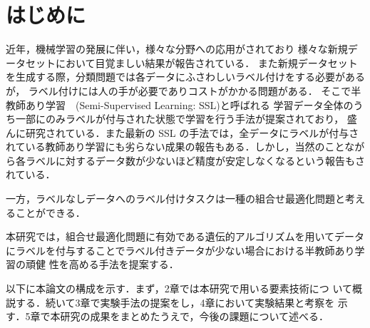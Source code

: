\newpage
\changeindent{0cm}
\section{はじめに}
\changeindent{2cm}
近年，機械学習の発展に伴い，様々な分野への応用がされており
様々な新規データセットにおいて目覚ましい結果が報告されている．
また新規データセットを生成する際，分類問題では各データにふさわしいラベル付けをする必要があるが，
ラベル付けには人の手が必要でありコストがかかる問題がある．
そこで半教師あり学習　(Semi-Supervised Learning: SSL)と呼ばれる
学習データ全体のうち一部にのみラベルが付与された状態で学習を行う手法が提案されており，
盛んに研究されている．また最新の SSL の手法では，全データにラベルが付与されている教師あり学習にも劣らない成果の報告\cite{sohn2020fixmatch}もある．しかし，当然のことながら各ラベルに対するデータ数が少ないほど精度が安定しなくなるという報告もされている．

一方，ラベルなしデータへのラベル付けタスクは一種の組合せ最適化問題と考えることができる．

本研究では，組合せ最適化問題に有効である遺伝的アルゴリズムを用いてデータにラベルを付与することでラベル付きデータが少ない場合における半教師あり学習の頑健
性を高める手法を提案する．

以下に本論文の構成を示す．まず，2章では本研究で用いる要素技術につ
いて概説する．続いて3章で実験手法の提案をし，4章において実験結果と考察を
示す．5章で本研究の成果をまとめたうえで，今後の課題について述べる．

